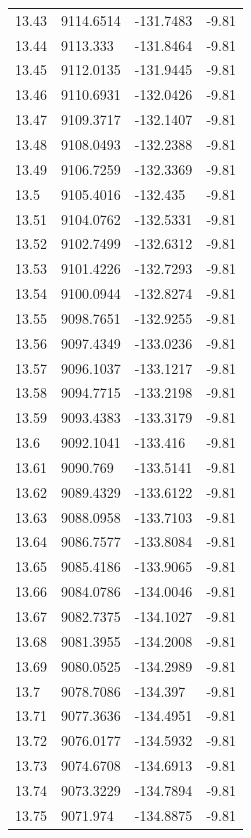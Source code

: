 \begin{table}[H]
\begin{tabular}{llll}
13.43 & 9114.6514 & -131.7483 & -9.81 \\
13.44 & 9113.333 & -131.8464 & -9.81 \\
13.45 & 9112.0135 & -131.9445 & -9.81 \\
13.46 & 9110.6931 & -132.0426 & -9.81 \\
13.47 & 9109.3717 & -132.1407 & -9.81 \\
13.48 & 9108.0493 & -132.2388 & -9.81 \\
13.49 & 9106.7259 & -132.3369 & -9.81 \\
13.5 & 9105.4016 & -132.435 & -9.81 \\
13.51 & 9104.0762 & -132.5331 & -9.81 \\
13.52 & 9102.7499 & -132.6312 & -9.81 \\
13.53 & 9101.4226 & -132.7293 & -9.81 \\
13.54 & 9100.0944 & -132.8274 & -9.81 \\
13.55 & 9098.7651 & -132.9255 & -9.81 \\
13.56 & 9097.4349 & -133.0236 & -9.81 \\
13.57 & 9096.1037 & -133.1217 & -9.81 \\
13.58 & 9094.7715 & -133.2198 & -9.81 \\
13.59 & 9093.4383 & -133.3179 & -9.81 \\
13.6 & 9092.1041 & -133.416 & -9.81 \\
13.61 & 9090.769 & -133.5141 & -9.81 \\
13.62 & 9089.4329 & -133.6122 & -9.81 \\
13.63 & 9088.0958 & -133.7103 & -9.81 \\
13.64 & 9086.7577 & -133.8084 & -9.81 \\
13.65 & 9085.4186 & -133.9065 & -9.81 \\
13.66 & 9084.0786 & -134.0046 & -9.81 \\
13.67 & 9082.7375 & -134.1027 & -9.81 \\
13.68 & 9081.3955 & -134.2008 & -9.81 \\
13.69 & 9080.0525 & -134.2989 & -9.81 \\
13.7 & 9078.7086 & -134.397 & -9.81 \\
13.71 & 9077.3636 & -134.4951 & -9.81 \\
13.72 & 9076.0177 & -134.5932 & -9.81 \\
13.73 & 9074.6708 & -134.6913 & -9.81 \\
13.74 & 9073.3229 & -134.7894 & -9.81 \\
13.75 & 9071.974 & -134.8875 & -9.81 \\

\end{tabular}
\end{table}
